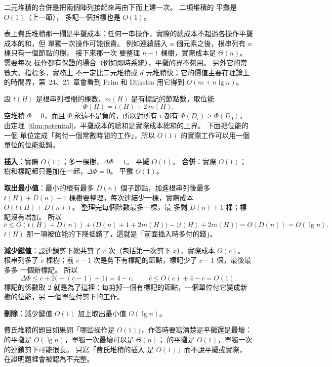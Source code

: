 二元堆積的合併是把兩個陣列接起來再由下而上建一次。 二項堆積的  平攤是
$O(1)$（上一節）， 多記一個指標也是 $O(1)$。

表上費氏堆積那一欄是平攤成本：任何一串操作，實際的總成本不超過各操作平攤成本的和，但
單獨一次操作可能很貴。 例如連續插入 $n$ 個元素之後，根串列有 $n$ 棵只有一個節點的樹，
接下來那一次  要整理 $n - 1$ 棵樹，實際成本是 $\Theta(n)$。 需要每次
操作都有保證的場合（例如即時系統），平攤的界不夠用。 另外它的常數大、指標多，實務上
不一定比二元堆積或 $d$ 元堆積快；它的價值主要在理論上的時間界，第~24、25~章會看到
Prim 和 Dijkstra 用它得到 $O(m + n \lg n)$。

\begin{whybox}[用位能法算費氏堆積的平攤成本]
設 $t(H)$ 是根串列裡樹的棵數，$m(H)$ 是有標記的節點數，取位能
\[
\Phi(H) = t(H) + 2\,m(H).
\]
空堆積 $\Phi = 0$，而且 $\Phi$ 永遠不是負的，所以對所有 $i$ 都有 $\Phi(D_i) \ge
\Phi(D_0)$，由定理~\ref{thm:potential}，平攤成本的總和是實際成本總和的上界。 下面把位能的一個
單位定成「夠付一個常數時間的工作」，所以 $O(1)$ 的實際工作可以用一個單位的位能抵銷。

\textbf{插入}：實際 $O(1)$；多一棵樹，$\Delta\Phi = 1$。 平攤 $O(1)$。 \textbf{合併}：實際
$O(1)$；樹和標記都只是加在一起，$\Delta\Phi = 0$。 平攤 $O(1)$。

\textbf{取出最小值}：最小的根有最多 $D(n)$ 個子節點，加進根串列後最多 $t(H) + D(n) - 1$
棵樹要整理，每次連結少一棵，實際成本 $O(t(H) + D(n))$。 整理完每個階數最多一棵，最
多剩 $D(n) + 1$ 棵；標記沒有增加。 所以
\[
\hat{c} \le O(t(H) + D(n)) + \bigl(D(n) + 1 + 2m(H)\bigr) - \bigl(t(H) + 2m(H)\bigr)
= O(D(n)) = O(\lg n).
\]
$t(H)$ 那一項被位能的下降抵銷了，這就是「前面插入時多付的錢」。

\textbf{減少鍵值}：設連鎖剪下總共剪了 $c$ 次（包括第一次剪下 $x$），實際成本 $O(c)$。
根串列多了 $c$ 棵樹；前 $c - 1$ 次是剪下有標記的節點，標記少了 $c - 1$ 個，最後最多多
一個新標記。 所以
\[
\Delta\Phi \le c + 2\bigl(-(c - 1) + 1\bigr) = 4 - c,
\qquad \hat{c} \le O(c) + 4 - c = O(1).
\]
標記的係數取 $2$ 就是為了這裡：每剪掉一個有標記的節點，一個單位付它變成新樹的位能，另
一個單位付剪下的工作。

\textbf{刪除}：減少鍵值 $O(1)$ 加上取出最小值 $O(\lg n)$。
\end{whybox}

\begin{examnote}
費氏堆積的題目如果問「哪些操作是 $O(1)$」，作答時要寫清楚是平攤還是最壞：
 的平攤是 $O(\lg n)$，單獨一次最壞可以是 $\Theta(n)$；
 的平攤是 $O(1)$，單獨一次的連鎖剪下可能很長。 只寫「費氏堆積的插入
是 $O(1)$」而不說平攤或實際，在證明題裡會被認為不完整。
\end{examnote}

